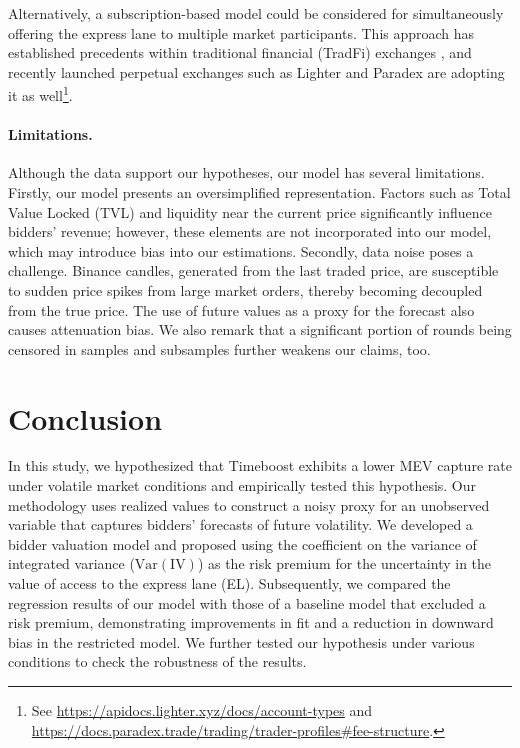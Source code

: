 \documentclass[runningheads]{llncs}
\newcommand{\Var}{\mathrm{Var}}
\newcommand{\IV}{\mathrm{IV}}
\begin{document}
Alternatively, a subscription-based model could be considered for simultaneously offering the express lane to multiple market participants. This approach has established precedents within traditional financial (TradFi) exchanges \cite{budish2024theory}, and recently launched perpetual exchanges such as Lighter and Paradex are adopting it as well\footnote{See \url{https://apidocs.lighter.xyz/docs/account-types} and \url{https://docs.paradex.trade/trading/trader-profiles\#fee-structure}.}.

\paragraph*{Limitations.}
Although the data support our hypotheses, our model has several limitations. Firstly, our model presents an oversimplified representation. Factors such as Total Value Locked (TVL) and liquidity near the current price significantly influence bidders' revenue; however, these elements are not incorporated into our model, which may introduce bias into our estimations. Secondly, data noise poses a challenge. Binance candles, generated from the last traded price, are susceptible to sudden price spikes from large market orders, thereby becoming decoupled from the true price. The use of future values as a proxy for the forecast also causes attenuation bias. We also remark that a significant portion of rounds being censored in samples and subsamples further weakens our claims, too.




\section{Conclusion}
In this study, we hypothesized that Timeboost exhibits a lower MEV capture rate under volatile market conditions and empirically tested this hypothesis. Our methodology uses realized values to construct a noisy proxy for an unobserved variable that captures bidders' forecasts of future volatility. We developed a bidder valuation model and proposed using the coefficient on the variance of integrated variance ($\Var(\IV)$) as the risk premium for the uncertainty in the value of access to the express lane (EL). 
Subsequently, we compared the regression results of our model with those of a baseline model that excluded a risk premium, demonstrating improvements in fit and a reduction in downward bias in the restricted model. We further tested our hypothesis under various conditions to check the robustness of the results.
\end{document}
